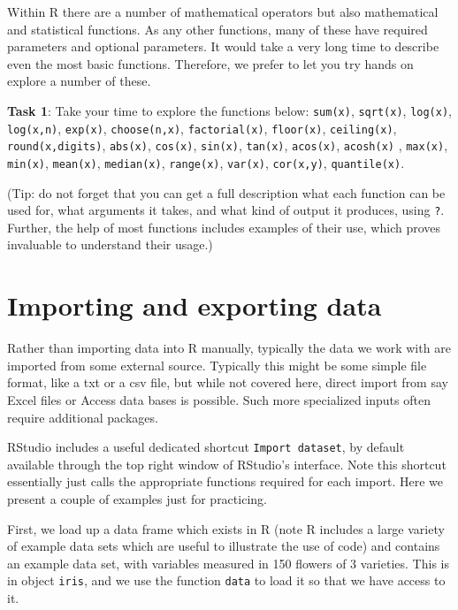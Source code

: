 \documentclass[
]{article}
\begin{document}
Within R there are a number of mathematical operators but also
mathematical and statistical functions. As any other functions, many of
these have required parameters and optional parameters. It would take a
very long time to describe even the most basic functions. Therefore, we
prefer to let you try hands on explore a number of these.

\textbf{Task 1}: Take your time to explore the functions below:
\texttt{sum(x)}, \texttt{sqrt(x)}, \texttt{log(x)}, \texttt{log(x,n)},
\texttt{exp(x)}, \texttt{choose(n,x)}, \texttt{factorial(x)},
\texttt{floor(x)}, \texttt{ceiling(x)}, \texttt{round(x,digits)},
\texttt{abs(x)}, \texttt{cos(x)}, \texttt{sin(x)}, \texttt{tan(x)},
\texttt{acos(x)}, \texttt{acosh(x)} , \texttt{max(x)}, \texttt{min(x)},
\texttt{mean(x)}, \texttt{median(x)}, \texttt{range(x)},
\texttt{var(x)}, \texttt{cor(x,y)}, \texttt{quantile(x)}.

(Tip: do not forget that you can get a full description what each
function can be used for, what arguments it takes, and what kind of
output it produces, using \texttt{?}. Further, the help of most
functions includes examples of their use, which proves invaluable to
understand their usage.)

\section{Importing and exporting
data}\label{importing-and-exporting-data}

Rather than importing data into R manually, typically the data we work
with are imported from some external source. Typically this might be
some simple file format, like a txt or a csv file, but while not covered
here, direct import from say Excel files or Access data bases is
possible. Such more specialized inputs often require additional
packages.

RStudio includes a useful dedicated shortcut \texttt{Import\ dataset},
by default available through the top right window of RStudio's
interface. Note this shortcut essentially just calls the appropriate
functions required for each import. Here we present a couple of examples
just for practicing.

First, we load up a data frame which exists in R (note R includes a
large variety of example data sets which are useful to illustrate the
use of code) and contains an example data set, with variables measured
in 150 flowers of 3 varieties. This is in object \texttt{iris}, and we
use the function \texttt{data} to load it so that we have access to it.
\end{document}
